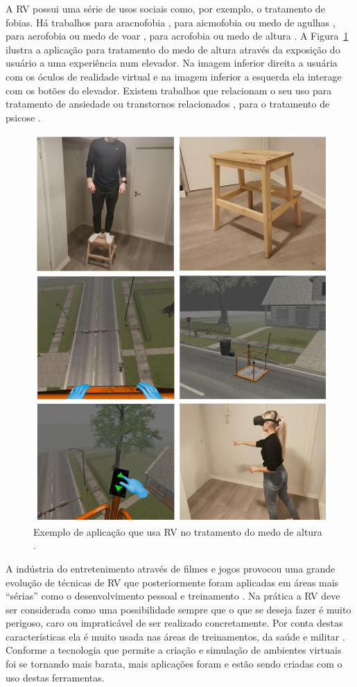 A \acrshort{RV} possui uma série de usos sociais como, por exemplo, o tratamento de fobias. Há trabalhos para aracnofobia \cite{Zimmer2021}, para aicmofobia ou medo de agulhas \cite{McCarthy2021}, para aerofobia ou medo de voar \cite{Rothbaum2006}, para acrofobia ou medo de altura \cite{Rimer2021}. A Figura~\ref{fig:medoAltura} ilustra a aplicação para tratamento do medo de altura através da exposição do usuário a uma experiência num elevador. Na imagem inferior direita a usuária com os óculos de realidade virtual e na imagem inferior a esquerda ela interage com os botões do elevador. Existem trabalhos que relacionam o seu uso para tratamento de ansiedade ou transtornos relacionados \cite{Meyerbroker2021}, para o tratamento de psicose \cite{Freeman2022}. 

\begin{figure}[ht!]
    \centering
    \includegraphics[width=0.6\linewidth]{capitulos/figuras/fear_of_heights.jpg}
    \caption{Exemplo de aplicação que usa \acrshort{RV} no tratamento do medo de altura \cite{Rimer2021}.}
    \label{fig:medoAltura}
\end{figure}

A indústria do entretenimento através de filmes e jogos provocou uma grande evolução de técnicas de \acrshort{RV} que posteriormente foram aplicadas em áreas mais “sérias” como o desenvolvimento pessoal e treinamento \cite{Soliman2021, Paszkiewicz2021, Lin2021, Vrillon2022}. Na prática a \acrshort{RV} deve ser considerada como uma possibilidade sempre que o que se deseja fazer é muito perigoso, caro ou impraticável de ser realizado concretamente. Por conta destas características ela é muito usada nas áreas de treinamentos, da saúde e militar \cite{VRS2018}. Conforme a tecnologia que permite a criação e simulação de ambientes virtuais foi se tornando mais barata, mais aplicações foram e estão sendo criadas com o uso destas ferramentas.

